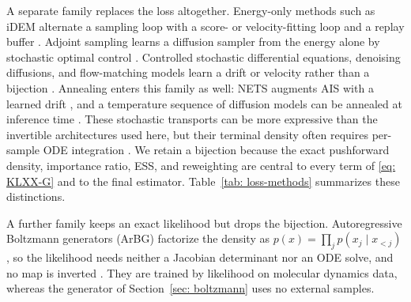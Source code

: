 \documentclass{article}
\begin{document}
A separate family replaces the loss altogether. Energy-only methods such as iDEM alternate a sampling loop with a score- or velocity-fitting loop and a replay buffer \citep{akhound2024iterated,woo2024iefm}. Adjoint sampling learns a diffusion sampler from the energy alone by stochastic optimal control \citep{havens2025adjoint}. Controlled stochastic differential equations, denoising diffusions, and flow-matching models learn a drift or velocity rather than a bijection \citep{zhang2022path,vargas2023denoising,berner2024optimal,nusken2021solving,richter2024improved}. Annealing enters this family as well: NETS augments AIS with a learned drift \citep{albergo2024nets}, and a temperature sequence of diffusion models can be annealed at inference time \citep{akhoundsadegh2025progressive}. These stochastic transports can be more expressive than the invertible architectures used here, but their terminal density often requires per-sample ODE integration \citep{he2025notrick}. We retain a bijection because the exact pushforward density, importance ratio, ESS, and reweighting are central to every term of \eqref{eq: KLXX-G} and to the final estimator. Table~\ref{tab: loss-methods} summarizes these distinctions.

A further family keeps an exact likelihood but drops the bijection. Autoregressive Boltzmann generators (ArBG) factorize the density as $p(x)=\prod_j p(x_j\mid x_{<j})$, so the likelihood needs neither a Jacobian determinant nor an ODE solve, and no map is inverted \citep{rehman2026autoregressive}. They are trained by likelihood on molecular dynamics data, whereas the generator of Section~\ref{sec: boltzmann} uses no external samples.
\end{document}
